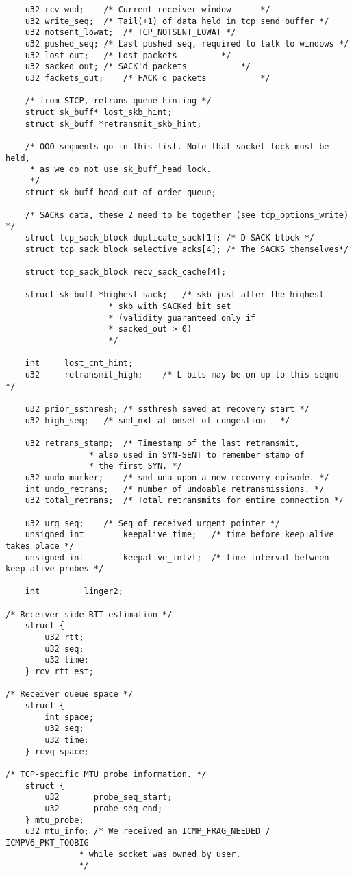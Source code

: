 \documentclass[11pt, a4paper,oneside]{book}
\theoremstyle{ocrenumbox}
\theoremstyle{purplenumbox}
\theoremstyle{blackbox}
\begin{document}
\begin{verbatim}
 	u32	rcv_wnd;	/* Current receiver window		*/
	u32	write_seq;	/* Tail(+1) of data held in tcp send buffer */
	u32	notsent_lowat;	/* TCP_NOTSENT_LOWAT */
	u32	pushed_seq;	/* Last pushed seq, required to talk to windows */
	u32	lost_out;	/* Lost packets			*/
	u32	sacked_out;	/* SACK'd packets			*/
	u32	fackets_out;	/* FACK'd packets			*/

	/* from STCP, retrans queue hinting */
	struct sk_buff* lost_skb_hint;
	struct sk_buff *retransmit_skb_hint;

	/* OOO segments go in this list. Note that socket lock must be held,
	 * as we do not use sk_buff_head lock.
	 */
	struct sk_buff_head	out_of_order_queue;

	/* SACKs data, these 2 need to be together (see tcp_options_write) */
	struct tcp_sack_block duplicate_sack[1]; /* D-SACK block */
	struct tcp_sack_block selective_acks[4]; /* The SACKS themselves*/

	struct tcp_sack_block recv_sack_cache[4];

	struct sk_buff *highest_sack;   /* skb just after the highest
					 * skb with SACKed bit set
					 * (validity guaranteed only if
					 * sacked_out > 0)
					 */

	int     lost_cnt_hint;
	u32     retransmit_high;	/* L-bits may be on up to this seqno */

	u32	prior_ssthresh; /* ssthresh saved at recovery start	*/
	u32	high_seq;	/* snd_nxt at onset of congestion	*/

	u32	retrans_stamp;	/* Timestamp of the last retransmit,
				 * also used in SYN-SENT to remember stamp of
				 * the first SYN. */
	u32	undo_marker;	/* snd_una upon a new recovery episode. */
	int	undo_retrans;	/* number of undoable retransmissions. */
	u32	total_retrans;	/* Total retransmits for entire connection */

	u32	urg_seq;	/* Seq of received urgent pointer */
	unsigned int		keepalive_time;	  /* time before keep alive takes place */
	unsigned int		keepalive_intvl;  /* time interval between keep alive probes */

	int			linger2;

/* Receiver side RTT estimation */
	struct {
		u32	rtt;
		u32	seq;
		u32	time;
	} rcv_rtt_est;

/* Receiver queue space */
	struct {
		int	space;
		u32	seq;
		u32	time;
	} rcvq_space;

/* TCP-specific MTU probe information. */
	struct {
		u32		  probe_seq_start;
		u32		  probe_seq_end;
	} mtu_probe;
	u32	mtu_info; /* We received an ICMP_FRAG_NEEDED / ICMPV6_PKT_TOOBIG
			   * while socket was owned by user.
			   */


\end{verbatim}
\end{document}
